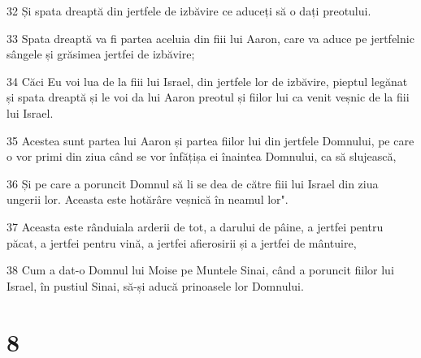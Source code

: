 \par 32 Și spata dreaptă din jertfele de izbăvire ce aduceți să o dați preotului.
\par 33 Spata dreaptă va fi partea aceluia din fiii lui Aaron, care va aduce pe jertfelnic sângele și grăsimea jertfei de izbăvire;
\par 34 Căci Eu voi lua de la fiii lui Israel, din jertfele lor de izbăvire, pieptul legănat și spata dreaptă și le voi da lui Aaron preotul și fiilor lui ca venit veșnic de la fiii lui Israel.
\par 35 Acestea sunt partea lui Aaron și partea fiilor lui din jertfele Domnului, pe care o vor primi din ziua când se vor înfățișa ei înaintea Domnului, ca să slujească,
\par 36 Și pe care a poruncit Domnul să li se dea de către fiii lui Israel din ziua ungerii lor. Aceasta este hotărâre veșnică în neamul lor".
\par 37 Aceasta este rânduiala arderii de tot, a darului de pâine, a jertfei pentru păcat, a jertfei pentru vină, a jertfei afierosirii și a jertfei de mântuire,
\par 38 Cum a dat-o Domnul lui Moise pe Muntele Sinai, când a poruncit fiilor lui Israel, în pustiul Sinai, să-și aducă prinoasele lor Domnului.

\chapter{8}

